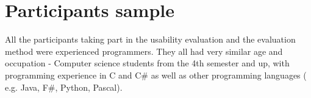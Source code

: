\section{Participants sample}
\label{section:Participant sample}
All the participants taking part in the usability evaluation and the evaluation method were experienced programmers. They all had very similar age and occupation - Computer science students from the 4th semester and up, with programming experience in C and C\# as well as other programming languages ( e.g. Java, F\#, Python, Pascal). 

